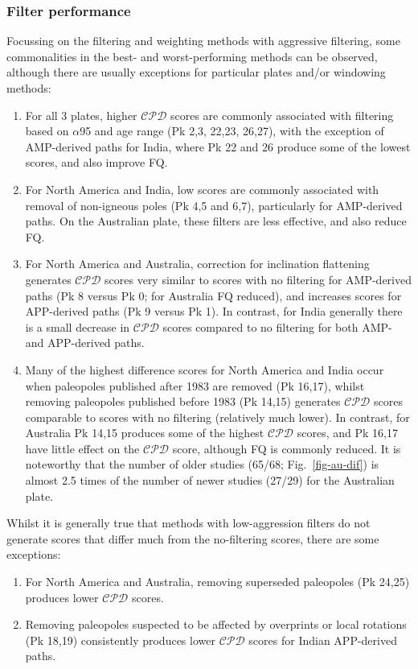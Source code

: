 \subsubsection{Filter performance}

Focussing on the filtering and weighting methods with aggressive filtering,
some commonalities in the best- and worst-performing methods can be observed,
although there are usually exceptions for particular plates and/or windowing
methods:
%
\begin{enumerate}
  \item For all 3 plates, higher $\mathcal{CPD}$ scores are commonly associated
		with filtering based on $\alpha$95 and age range (Pk 2,3, 22,23, 26,27),
		with the exception of AMP-derived paths for India, where Pk 22 and 26
		produce some of the lowest scores, and also improve FQ\@.
  \item For North America and India, low scores are commonly associated with
		removal of non-igneous poles (Pk 4,5 and 6,7), particularly for
		AMP-derived paths. On the Australian plate, these filters are less
		effective, and also reduce FQ\@.
  \item For North America and Australia, correction for inclination flattening
		generates $\mathcal{CPD}$ scores very similar to scores with no
		filtering for AMP-derived paths (Pk 8 versus Pk 0; for Australia FQ
		reduced), and increases scores for APP-derived paths (Pk 9 versus Pk 1).
		In contrast, for India generally there is a small decrease in
		$\mathcal{CPD}$ scores compared to no filtering for both AMP- and
		APP-derived paths.
  \item Many of the highest difference scores for North America and India occur
		when paleopoles published after 1983 are removed (Pk 16,17), whilst
		removing paleopoles published before 1983 (Pk 14,15) generates
		$\mathcal{CPD}$ scores comparable to scores with no filtering
		(relatively much lower). In contrast, for Australia Pk 14,15
		produces some of the highest $\mathcal{CPD}$ scores, and Pk 16,17
		have little effect on the $\mathcal{CPD}$ score, although FQ is
		commonly reduced. It is noteworthy that the number of older studies
		(65/68; Fig.~\ref{fig-au-dif}) is almost 2.5 times of the number of
		newer studies (27/29) for the Australian plate.
\end{enumerate}

Whilst it is generally true that methods with low-aggression filters do not
generate scores that differ much from the no-filtering scores, there are some
exceptions:
%
\begin{enumerate}
  \item For North America and Australia, removing superseded paleopoles (Pk
		24,25) produces lower $\mathcal{CPD}$ scores.
  \item Removing paleopoles suspected to be affected by overprints or local
		rotations (Pk 18,19) consistently produces lower
		$\mathcal{CPD}$ scores for Indian APP-derived paths.
\end{enumerate}


